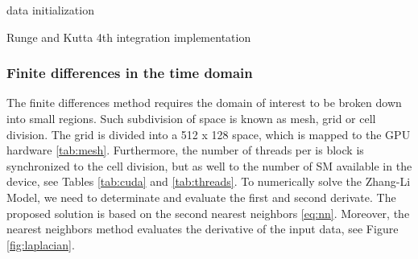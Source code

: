 \begin{algorithm}[H]
 data initialization\;
 \label{log:rk4}
 \caption{Runge and Kutta 4th integration implementation}
\end{algorithm}

\subsubsection{Finite differences in the time domain}

The finite differences method requires the domain of interest to be broken down into small regions. Such subdivision of space is known as mesh, grid or cell division. The grid is divided into a 512 x 128 space, which is mapped to the GPU hardware \ref{tab:mesh}. Furthermore, the number of threads per is block is synchronized to the cell division, but as well to the number of SM available in the device, see Tables \ref{tab:cuda} and \ref{tab:threads}.
To numerically solve the Zhang-Li Model, we need to determinate and evaluate the first and second derivate. The proposed solution is based on the second nearest neighbors \ref{eq:nn}. Moreover, the nearest neighbors method evaluates the derivative of the input data, see Figure \ref{fig:laplacian}.

